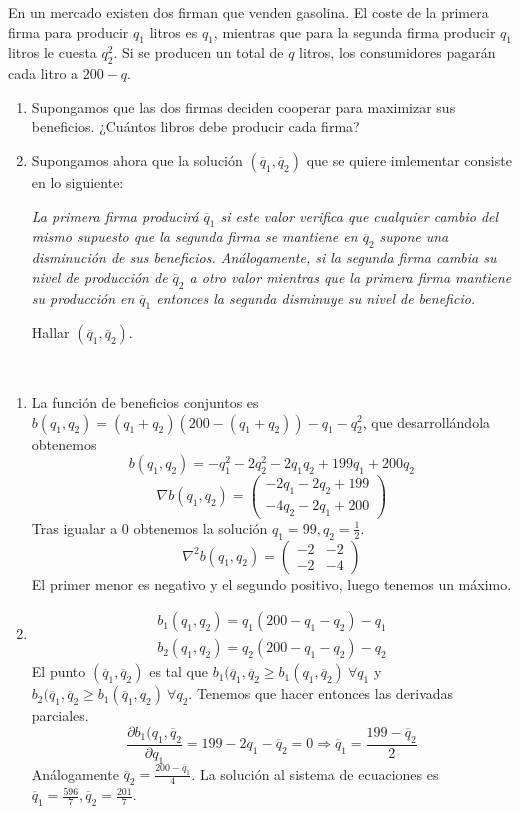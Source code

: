 \documentclass[twoside]{article}
\begin{document}
\begin{ejercicio}{11}
En un mercado existen dos firman que venden gasolina. El coste de la primera firma para producir $q_1$ litros es $q_1$, mientras que para la segunda firma producir $q_1$ litros le cuesta $q_2^2$. Si se producen un total de $q$ litros, los consumidores pagarán cada litro a $200-q$.
\begin{enumerate}
\item Supongamos que las dos firmas deciden cooperar para maximizar sus beneficios. ¿Cuántos libros debe producir cada firma?
\item Supongamos ahora que la solución $(\overline{q}_1,\overline{q}_2)$ que se quiere imlementar consiste en lo siguiente:

\emph{La primera firma producirá $\overline{q}_1$ si este valor verifica que cualquier cambio del mismo supuesto que la segunda firma se mantiene en $\overline{q}_2$ supone una disminución de sus beneficios. Análogamente, si la segunda firma cambia su nivel de producción de $\overline{q}_2$ a otro valor mientras que la primera firma mantiene su producción en $\overline{q}_1$ entonces la segunda disminuye su nivel de beneficio.}

Hallar $(\overline{q}_1,\overline{q}_2)$.
\end{enumerate}
\begin{solucion}\
\begin{enumerate}


\item La función de beneficios conjuntos es $b(q_1,q_2)=(q_1+q_2)(200-(q_1+q_2))-q_1-q_2^2$, que desarrollándola obtenemos
$$b(q_1,q_2)=-q_1^2-2q_2^2-2q_1q_2+199q_1+200q_2$$
$$\nabla b(q_1,q_2)=\begin{pmatrix}
-2q_1-2q_2+199\\
-4q_2-2q_1+200
\end{pmatrix}$$
Tras igualar a 0 obtenemos la solución $q_1=99,q_2=\frac{1}{2}$. 
$$\nabla^2b(q_1,q_2)=\begin{pmatrix}
-2 & -2\\
-2 & -4
\end{pmatrix}$$
El primer menor es negativo y el segundo positivo, luego tenemos un máximo.
\item 
\begin{gather*}
b_1(q_1,q_2)=q_1(200-q_1-q_2)-q_1\\
b_2(q_1,q_2)=q_2(200-q_1-q_2)-q_2
\end{gather*}
El punto $(\overline{q}_1,\overline{q}_2)$ es tal que $b_1(\overline{q}_1,\overline{q}_2\geq b_1(q_1,\overline{q}_2)\ \forall q_1$ y $b_2(\overline{q}_1,\overline{q}_2\geq b_1(\overline{q}_1,q_2)\ \forall q_2$. Tenemos que hacer entonces las derivadas parciales.
$$\frac{\partial b_1(q_1,\overline{q}_2}{\partial q_1}=199-2q_1-\overline{q}_2=0\Rightarrow \overline{q}_1=\frac{199-\overline{q}_2}{2}$$
Análogamente $\overline{q}_2=\frac{200-\overline{q}_1}{4}$. La solución al sistema de ecuaciones es $\overline{q}_1=\frac{596}{7},\overline{q}_2=\frac{201}{7}$.
\end{enumerate}
\end{solucion}
\end{ejercicio}
\end{document}
